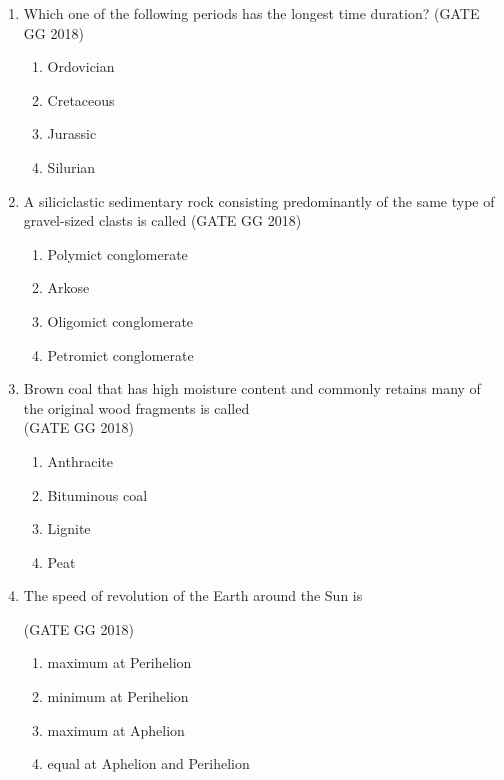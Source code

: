\documentclass[journal]{IEEEtran}
\begin{document}
\begin{enumerate}[start=1]
    \item  Which one of the following periods has the longest time duration? 
\hfill(GATE GG 2018)
\begin{multicols}{4}
\begin{enumerate}
\item Ordovician
\item Cretaceous
\item Jurassic
\item Silurian
\end{enumerate}
\end{multicols}

\item  A siliciclastic sedimentary rock consisting predominantly of the same type of gravel-sized clasts is called  
\hfill(GATE GG 2018)
\begin{multicols}{2}
\begin{enumerate}
\item Polymict conglomerate
\item Arkose
\item Oligomict conglomerate
\item Petromict conglomerate
\end{enumerate}
\end{multicols}

\item Brown coal that has high moisture content and commonly retains many of the original wood fragments is called\\
\hspace*{15.7cm}(GATE GG 2018)
\begin{multicols}{2}
\begin{enumerate}
\item Anthracite
\item Bituminous coal
\item Lignite
\item Peat
\end{enumerate}
\end{multicols} 

\item The speed of revolution of the Earth around the Sun is  

\hfill(GATE GG 2018)
\begin{enumerate}
\item maximum at Perihelion
\item minimum at Perihelion
\item maximum at Aphelion
\item equal at Aphelion and Perihelion
\end{enumerate}


\end{enumerate}
\end{document}
